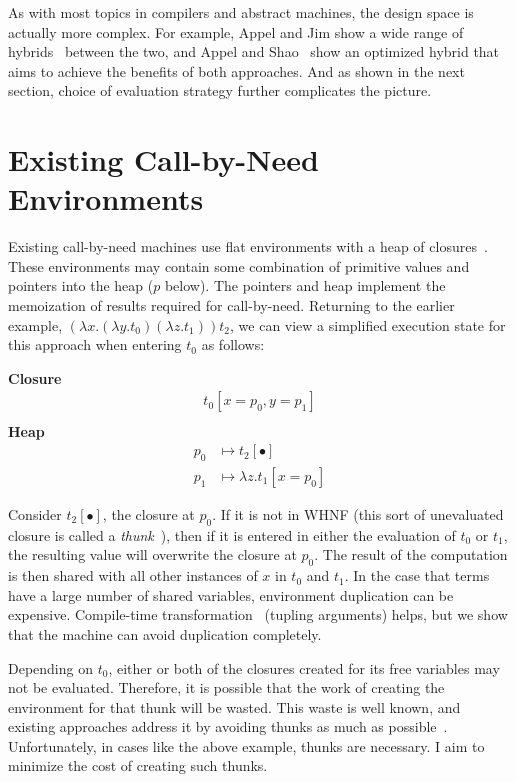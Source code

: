 As with most topics in compilers and abstract machines, the design space is
actually more complex. For example, Appel and Jim show a wide range of
hybrids~\cite{appel1988optimizing} between the two, and Appel and
Shao~\cite{shao1994space} show an optimized hybrid that aims to achieve the
benefits of both approaches. And as shown in the next section, choice of
evaluation strategy further complicates the picture.

\section{Existing Call-by-Need Environments} \label{sec:exist}

Existing call-by-need machines use flat environments with a heap of
closures~\cite{jonesstg,TIM,johnsson1984efficient,boquist1997grin}. These
environments may contain some combination of primitive values and pointers into the
heap ($p$ below). The pointers and heap implement the memoization of results
required for call-by-need. Returning to the earlier example, $(\lambda
x.(\lambda y.t_0) (\lambda z.t_1)) t_2$, we can view a simplified execution state
for this approach when entering $t_0$ as follows:

\begin{center}
\textbf{Closure}
\begin{align*}
t_0[x=p_0, y=p_1] \\
\end{align*}
\textbf{Heap}
\begin{align*}
p_0 &\mapsto t_2[\bullet] \\
p_1 &\mapsto \lambda z.t_1[x=p_0] 
\end{align*}
\end{center}

Consider $t_2[\bullet]$, the closure at $p_0$. If it is not in WHNF (this sort
of unevaluated closure is called a
\emph{thunk}~\cite{ingerman1961way,peyton1992implementing}), then if it is
entered in either the evaluation of $t_0$ or $t_1$, the resulting value will
overwrite the closure at $p_0$. The result of the computation is then shared
with all other instances of $x$ in $t_0$ and $t_1$. In the case that terms have a
large number of shared variables, environment duplication can be expensive.
Compile-time transformation~\cite{peyton1992implementing} (tupling arguments)
helps, but we show that the machine can avoid duplication completely.

Depending on $t_0$, either or both of the closures created for its free variables
may not be evaluated. Therefore, it is possible that the work of creating the
environment for that thunk will be wasted. This waste is well known, and
existing approaches address it by avoiding thunks as much as
possible~\cite{jonesstg,johnsson1984efficient}. Unfortunately, in cases like the
above example, thunks are necessary. I aim to minimize the cost of creating such
thunks.

